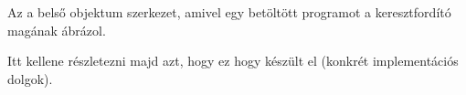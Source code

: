 
Az a belső objektum szerkezet, amivel egy betöltött programot a keresztfordító magának ábrázol.

Itt kellene részletezni majd azt, hogy ez hogy készült el (konkrét implementációs dolgok).
